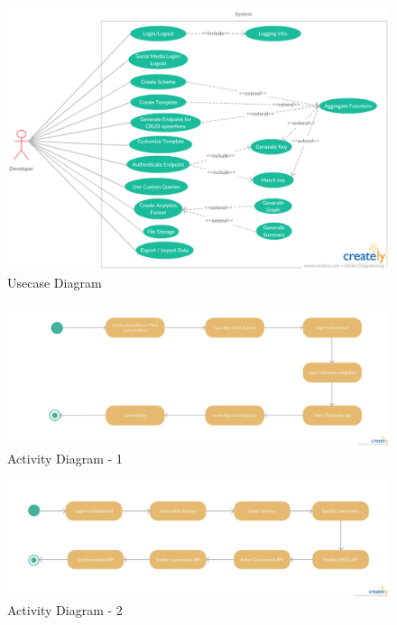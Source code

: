 \documentclass[a4paper,12pt]{report}
\begin{document}
        \begin{figure}[h] \centering
          \includegraphics[width=8.5in, angle=90]{images/usecase.png}
        \caption{ Usecase Diagram}  
        \end{figure}

        \begin{figure}[h] \centering
          \includegraphics[width=8.5in , angle=90]{images/PPI-2.png}
          \caption{ Activity Diagram - 1}  
        \end{figure}

        \begin{figure}[h] \centering
          \includegraphics[width=8.5in , angle=90]{images/PPI-3.png}
          \caption{ Activity Diagram - 2}  
        \end{figure}
\end{document}
